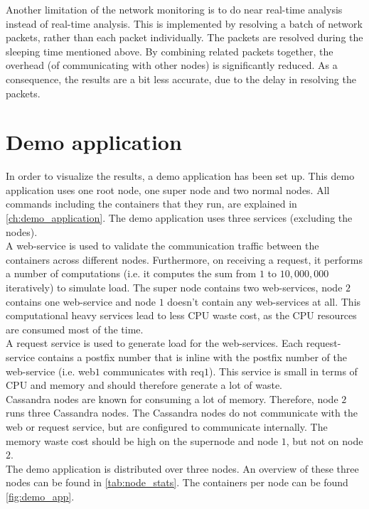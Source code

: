 \noindent
Another limitation of the network monitoring is to do near real-time analysis instead of real-time analysis. This is implemented by resolving a batch of network packets, rather than each packet individually. The packets are resolved during the sleeping time mentioned above. By combining related packets together, the overhead (of communicating with other nodes) is significantly reduced. As a consequence, the results are a bit less accurate, due to the delay in resolving the packets.


\section{Demo application} \label{sec:demo_app}
In order to visualize the results, a demo application has been set up. This demo application uses one root node, one super node and two normal nodes. All commands including the containers that they run, are explained in \autoref{ch:demo_application}. The demo application uses three services (excluding the nodes).\\

\noindent
A web-service is used to validate the communication traffic between the containers across different nodes. Furthermore, on receiving a request, it performs a number of computations (i.e. it computes the sum from $1$ to $10,000,000$ iteratively) to simulate load. The super node contains two web-services, node $2$ contains one web-service and node $1$ doesn't contain any web-services at all. This computational heavy services lead to less CPU waste cost, as the CPU resources are consumed most of the time.\\

\noindent
A request service is used to generate load for the web-services. Each request-service contains a postfix number that is inline with the postfix number of the web-service (i.e. web$1$ communicates with req$1$). This service is small in terms of CPU and memory and should therefore generate a lot of waste.\\

\noindent
Cassandra nodes are known for consuming a lot of memory. Therefore, node $2$ runs three Cassandra nodes. The Cassandra nodes do not communicate with the web or request service, but are configured to communicate internally. The memory waste cost should be high on the supernode and node $1$, but not on node $2$.\\

\noindent
The demo application is distributed over three nodes. An overview of these three nodes can be found in \autoref{tab:node_stats}. The containers per node can be found \autoref{fig:demo_app}.\\

